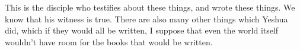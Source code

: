 \myverse{}This is the disciple who testifies about these things, and wrote
these things. We know that his witness is true.
\myverse{}There are also many other things which Yeshua did, which if they would all
be written, I suppose that even the world itself wouldn’t have room for the books that would be written.



